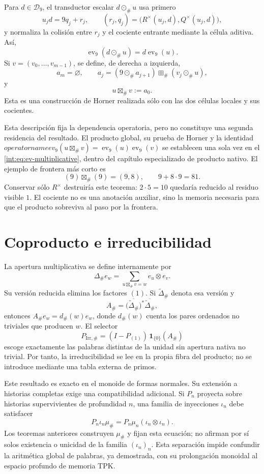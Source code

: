 Para \(d\in\mathcal D_9\), el transductor escalar
\(d\odot_\#u\) usa primero
\[
 u_jd=9q_j+r_j,\qquad
 (r_j,q_j)=\bigl(R^\times(u_j,d),Q^\times(u_j,d)\bigr),
\]
y normaliza la colisi\'on entre \(r_j\) y el cociente entrante mediante la
c\'elula aditiva. As\'i,
\[
 \operatorname{ev}_9(d\odot_\#u)
 =d\operatorname{ev}_9(u).
\]
Si \(v=(v_0,\ldots,v_{m-1})\), se define, de derecha a izquierda,
\[
 a_m=\varnothing,\qquad
 a_j=(9\odot_\#a_{j+1})\boxplus_\#(v_j\odot_\#u),
\]
y
\[
 u\boxtimes_\#v:=a_0.
\]
Esta es una construcci\'on de Horner realizada s\'olo con las dos c\'elulas
locales y sus cocientes.

Esta descripción fija la dependencia operatoria, pero no constituye una
segunda residencia del resultado. El producto global, su prueba de Horner y
la identidad
\(operatorname{ev}_9(u\boxtimes_\#v)
=\operatorname{ev}_9(u)\operatorname{ev}_9(v)\)
se establecen una sola vez en el
\cref{int:eq:ev-multiplicative}, dentro del capítulo especializado de producto
nativo.
El ejemplo de frontera m\'as corto es
\[
 (9)\boxtimes_\#(9)=(9,8),\qquad 9+8\cdot9=81.
\]
Conservar s\'olo \(R^\times\) destruir\'ia este teorema: \(2\cdot5=10\)
quedar\'ia reducido al residuo visible \(1\). El cociente no es una anotaci\'on
auxiliar, sino la memoria necesaria para que el producto sobreviva al paso por
la frontera.

\section{Coproducto e irreducibilidad}

La apertura multiplicativa se define internamente por
\[
 \Delta_\#e_w
 =\sum_{u\boxtimes_\#v=w}e_u\otimes e_v.
\]
Su versi\'on reducida elimina los factores \((1)\). Si
\(\widetilde\Delta_\#\) denota esa versi\'on y
\[
 A_\#=
 \bigl(\overline{\widetilde\Delta_\#}\bigr)^*
 \overline{\widetilde\Delta_\#},
\]
entonces \(A_\#e_w=d_\#(w)e_w\), donde \(d_\#(w)\) cuenta los pares ordenados
no triviales que producen \(w\). El selector
\[
 P_{\mathrm{Irr},\#}
 =(I-P_{(1)})\,\mathbf1_{\{0\}}(A_\#)
\]
escoge exactamente las palabras distintas de la unidad sin apertura nativa no
trivial. Por tanto, la irreducibilidad se lee en la propia fibra del producto;
no se introduce mediante una tabla externa de primos.

Este resultado es exacto en el monoide de formas normales. Su extensi\'on a
historias completas exige una compatibilidad adicional. Si \(P_n\) proyecta
sobre historias supervivientes de profundidad \(n\), una familia de
inyecciones \(\iota_n\) debe satisfacer
\[
 P_n\iota_n\mu_\#
 =P_n\mu_n(\iota_n\otimes\iota_n).
\]
Los teoremas anteriores construyen \(\mu_\#\) y fijan esta ecuaci\'on; no
afirman por s\'i solos existencia o unicidad de la familia
\((\iota_n)_n\). Esta separaci\'on impide confundir la aritm\'etica global de
palabras, ya demostrada, con su prolongaci\'on monoidal al espacio profundo de
memoria TPK\@.


